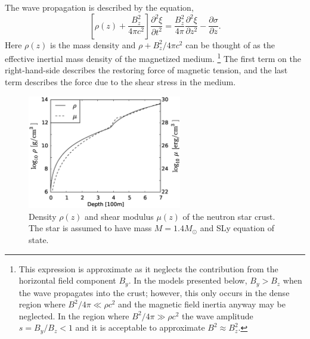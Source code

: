 The wave propagation is described by the equation,
\begin{equation}
\label{eq:wave}
   \left[\rho(z)+\frac{B_z^2}{4\pi c^2}\right]\frac{\partial^2\xi}{\partial t^2} 
   = \frac{B_z^2}{4\pi}\frac{\partial^2\xi}{\partial z^2} - \frac{\partial\sigma}{\partial z}. 
\end{equation}
Here $\rho(z)$ is the mass density and $\rho+B_z^2/4\pi c^2$ can be thought of as the effective inertial mass density of the magnetized medium.
\footnote{This expression is approximate as it neglects the contribution from the horizontal field component $B_y$. 
In the models presented below, $B_y>B_z$ when the wave propagates into the crust; however, this only occurs in the dense region where $B^2/4\pi\ll \rho c^2$ and the magnetic field inertia anyway may be neglected. 
In the region where $B^2/4\pi\gg \rho c^2$ the wave amplitude $s=B_y/B_z<1$ and it is acceptable to approximate $B^2\approx B_z^2$.}
The first term on the right-hand-side describes the restoring force of magnetic tension, and the last term describes the force due to the shear stress in the medium.

\begin{figure}[h]
\centering
\includegraphics[width=0.6\textwidth]{pics/chap3/fig1.eps} 
\caption[Density $\rho(z)$ and shear modulus $\mu(z)$ of the neutron star crust]{Density $\rho(z)$ and shear modulus $\mu(z)$ of the neutron star crust. 
The star is assumed to have mass $M=1.4 M_{\odot}$ and SLy equation of state.}
\label{fig1}
\end{figure}

